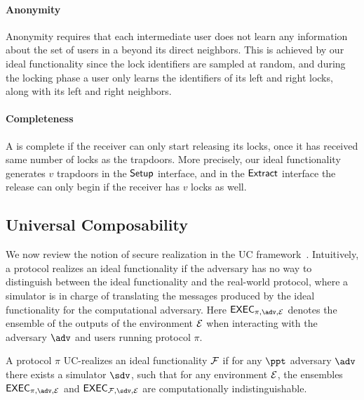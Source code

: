 \paragraph{Anonymity} Anonymity requires that each intermediate user does not learn any information 
about the set of users in a \sysname beyond its direct neighbors.
This is achieved by our ideal functionality since the lock identifiers are sampled at random, and 
during the locking phase a user only learns the identifiers of its left and right locks, along with 
its left and right neighbors.


\paragraph{Completeness} A \sysname is complete if the receiver can only start releasing its locks,
once it has received same number of locks as the trapdoors. More precisely, our ideal functionality 
generates $v$ trapdoors in the $\mathsf{Setup}$ interface, and in the $\mathsf{Extract}$ interface the release can 
only begin if the receiver has $v$ locks as well.

\subsection{Universal Composability}
\label{sec:uc}

We now review the notion of secure realization in the UC framework~\cite{canetti}. 
Intuitively, a protocol realizes an ideal functionality if the adversary has no way 
to distinguish between the ideal functionality and the real-world protocol, where 
a simulator is in charge of translating the messages produced by the ideal functionality 
for the computational adversary. Here $\exec_{\pi, \adv, \dist}$ denotes the ensemble of 
the outputs of the environment $\mathcal{E}$ when interacting with the adversary $\adv$ and 
users running protocol $\pi$.

\begin{definition}
A protocol $\pi$ UC-realizes an ideal functionality $\mathcal{F}$ if for any $\ppt$ adversary 
$\adv$ there exists a simulator $\sdv$, such that for any environment $\mathcal{E}$, the 
ensembles $\exec_{\pi, \adv, \dist}$ and $\exec_{\FF, \sdv, \dist}$ are computationally 
indistinguishable.
\end{definition}

